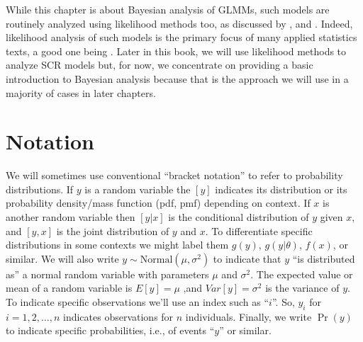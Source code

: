 While this chapter is about Bayesian analysis of GLMMs, such models
are routinely analyzed using likelihood methods too, as discussed by
\citet{royle_dorazio:2008}, and \citet{kery:2010}. Indeed, likelihood
analysis of such models is the primary focus of many applied
statistics texts, a good one being \citet{zuur_etal:2009}. Later in
this book, we will use likelihood methods to analyze SCR models but,
for now, we concentrate on providing a basic introduction to Bayesian
analysis because that is the approach we will use in a majority of
cases in later chapters.


\section{ Notation}

We will sometimes use conventional ``bracket notation'' to refer to
probability distributions. If $y$ is a random variable the $[y]$
indicates its distribution or its probability density/mass function
(pdf, pmf) depending on context. If $x$ is another random variable
then $[y|x]$ is the conditional distribution of $y$ given $x$, and
$[y,x]$ is the joint distribution of $y$ and $x$. To differentiate
specific distributions in some contexts we might label them $g(y)$,
$g(y|\theta)$, $f(x)$, or similar. We will also write $y \sim
\mbox{Normal}(\mu,\sigma^{2})$ to indicate that $y$ ``is distributed as'' a normal
random variable with parameters $\mu$ and $\sigma^{2}$. The expected value
or mean of a random variable is $E[y] = \mu$ ,and $Var[y] = \sigma^{2}$ is
the variance of $y$.  To indicate specific observations we'll use an
index such as ``$i$''. So, $y_{i}$ for $i=1,2,\ldots,n$ indicates
observations for $n$ individuals. Finally, we write $\Pr(y)$ to indicate specific probabilities, i.e., of events ``$y$'' or similar. 


